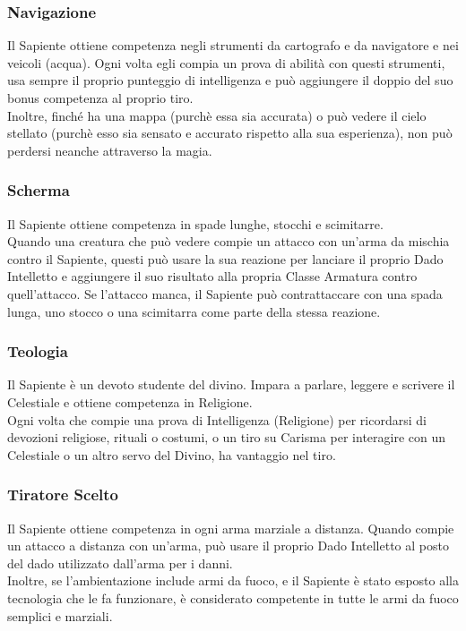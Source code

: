 \subsubsection{Navigazione}
Il Sapiente ottiene competenza negli strumenti da cartografo e da navigatore e  nei veicoli (acqua). Ogni volta egli compia un prova di abilità con questi strumenti, usa sempre il proprio punteggio di intelligenza e può aggiungere il doppio del suo bonus competenza al proprio tiro.\\
Inoltre, finché ha una mappa (purchè essa sia accurata) o può vedere il cielo stellato (purchè esso sia sensato e accurato rispetto alla sua esperienza), non può perdersi neanche attraverso la magia.

\subsubsection{Scherma}
Il Sapiente ottiene competenza in spade lunghe, stocchi e scimitarre.\\
Quando una creatura che può vedere compie un attacco con un'arma da mischia contro il Sapiente, questi può usare la sua reazione per lanciare il proprio Dado Intelletto e aggiungere il suo risultato alla propria Classe Armatura contro quell'attacco. Se l'attacco manca, il Sapiente può contrattaccare con una spada lunga, uno stocco o una scimitarra come parte della stessa reazione.

\subsubsection{Teologia}
Il Sapiente è un devoto studente del divino. Impara a parlare, leggere e scrivere il Celestiale e ottiene competenza in Religione.\\
Ogni volta che compie una prova di Intelligenza (Religione) per ricordarsi di devozioni religiose, rituali o costumi, o un tiro su Carisma per interagire con un Celestiale o un altro servo del Divino, ha vantaggio nel tiro.

\subsubsection{Tiratore Scelto}
Il Sapiente ottiene competenza in ogni arma marziale a distanza. Quando compie un attacco a distanza con un'arma, può usare il proprio Dado Intelletto al posto del dado utilizzato dall'arma per i danni.\\
Inoltre, se l'ambientazione include armi da fuoco, e il Sapiente è stato esposto alla tecnologia che le fa funzionare, è considerato competente in tutte le armi da fuoco semplici e marziali.

